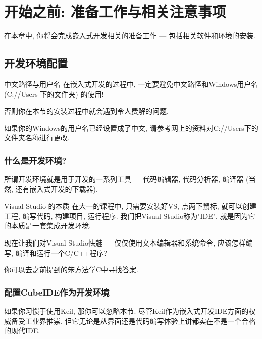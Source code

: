 \chapter{开始之前: 准备工作与相关注意事项}

在本章中, 你将会完成嵌入式开发相关的准备工作 --- 包括相关软件和环境的安装.

\section{开发环境配置}

\begin{theorem}{中文路径与用户名}
	在嵌入式开发的过程中, 一定要避免中文路径和Windows用户名 (C://Users  下的文件夹) 的使用!

	否则你在本节的安装过程中就会遇到令人费解的问题.

	如果你的Windows的用户名已经设置成了中文, 请参考网上的资料对C://Users下的文件夹名称进行更改.
\end{theorem}

\subsection{什么是开发环境?}

所谓开发环境就是用于开发的一系列工具 --- 代码编辑器, 代码分析器, 编译器 (当然, 还有嵌入式开发的下载器).

\begin{definition}{Visual Studio 的本质}
	在大一的课程中, 只需要安装好VS, 点两下鼠标, 就可以创建工程, 编写代码, 构建项目, 运行程序. 我们把Visual Studio称为"IDE", 就是因为它的本质是一套集成开发环境.

	现在让我们对Visual Studio怯魅 --- 仅仅使用文本编辑器和系统命令, 应该怎样编写, 编译和运行一个C/C++程序?

	你可以去之前提到的笨方法学C中寻找答案.
\end{definition}

\subsection{配置CubeIDE作为开发环境}

如果你习惯于使用Keil, 那你可以忽略本节. 尽管Keil作为嵌入式开发IDE方面的权威备受工业界推崇, 但它无论是从界面还是代码编写体验上讲都实在不是一个合格的现代IDE.

